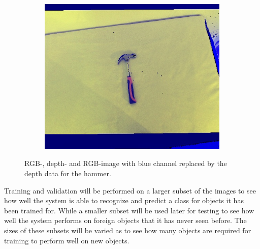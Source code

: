 \begin{figure}
\begin{subfigure}[b]{0.3\textwidth}
		\includegraphics[width=\textwidth]{img/methods/rgbd/rgbd.jpg}
	\end{subfigure}
	\caption{RGB-, depth- and RGB-image with blue channel replaced by the depth data for the hammer.}
	\label{fig:rgbd}
\end{figure}

Training and validation will be performed on a larger subset of the images to see how well the system is able to recognize and predict a class for objects it has been trained for. While a smaller subset will be used later for testing to see how well the system performs on foreign objects that it has never seen before. The sizes of these subsets will be varied as to see how many objects are required for training to perform well on new objects.
